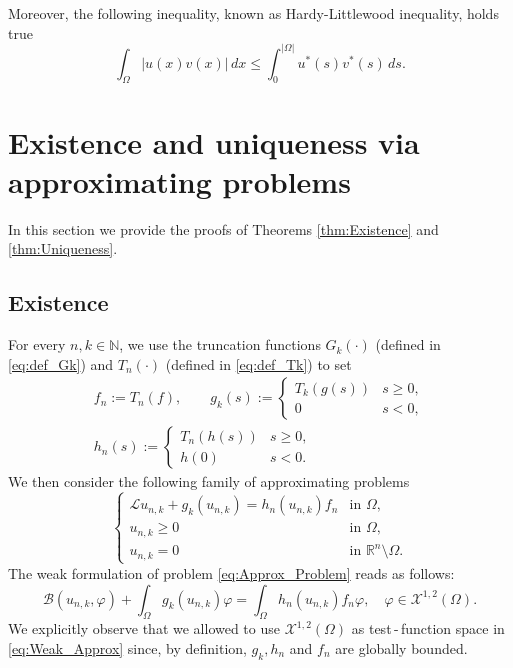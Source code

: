 \documentclass[11pt,a4paper]{amsart}
\theoremstyle{definition}
\theoremstyle{plain}
\numberwithin{equation}{section}
\begin{document}
{Moreover, the following inequality, known as Hardy-Littlewood inequality, holds true
\begin{equation*}
	\int_{\Omega}|u(x) v(x)| \,d x \leq \int_{0}^{|\Omega|} u^{*}(s) v^{*}(s) \,d s. 
\end{equation*}





  
  \section{Existence and uniqueness via approximating problems}\label{sec:Existence_and_uniqueness}
  In this section we provide the proofs of Theorems \ref{thm:Existence} and \ref{thm:Uniqueness}.
  \subsection{Existence}
For every $n,k\in \mathbb{N}$, we use the truncation functions $G_{k}(\cdot)$ 
(defined in \eqref{eq:def_Gk}) and $T_{n}(\cdot)$ (defined in \eqref{eq:def_Tk}) to 
set 
 \begin{equation} \label{eq:fngnhnGeneral}
 \begin{gathered}
 f_n:= T_{n}(f),
\qquad
 g_{k}(s):= \left\{ \begin{array}{rl}
 T_{k}(g(s)) & s\geq 0,\\
 0 & s< 0,
 \end{array}\right.
\\[0.1cm]
 h_{n}(s):= \left\{ \begin{array}{rl}
 T_{n}(h(s)) & s\geq 0,\\
 h(0) & s< 0.
 \end{array}\right.
 \end{gathered}
 \end{equation}
We then consider the following family of approximating problems
\begin{equation}\label{eq:Approx_Problem}
\left\{ \begin{array}{rl}
\mathcal{L}u_{n,k} + g_{k}(u_{n,k}) = h_n(u_{n,k})f_n & \textrm{in } \Omega,\\
u_{n,k} \geq 0 & \textrm{in } \Omega,\\
u_{n,k} = 0 & \textrm{in } \mathbb{R}^{n}\setminus \Omega.\end{array}\right.
\end{equation}  
The weak formulation of problem \eqref{eq:Approx_Problem} reads as follows:
\begin{equation}\label{eq:Weak_Approx}
\mathcal{B}(u_{n,k}, \varphi) + \int_{\Omega}g_{k}(u_{n,k})\varphi = \int_{\Omega}h_{n}(u_{n,k})f_{n}\varphi, \quad  \varphi \in \mathcal{X}^{1,2}(\Omega).
\end{equation}  
 We explicitly observe that we allowed to use $\mathcal{X}^{1,2}(\Omega)$ 
 as test\,-\,function space in \eqref{eq:Weak_Approx} since, by definition, $g_k,h_n$ and $f_n$ are globally bounded. 
  
}
\end{document}
